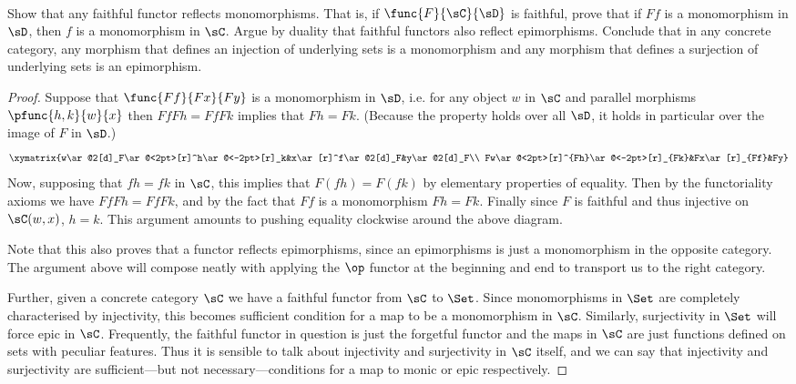 \documentclass[../../main]{subfiles}
\begin{document}
\paragraph{}
\begin{exercise}
	Show that any faithful functor reflects monomorphisms. That is, if
	\(\func{F}{\sC}{\sD}\) is faithful, prove that if \(Ff\) is a monomorphism
	in \(\sD\), then \(f\) is a monomorphism in \(\sC\). Argue by duality that
	faithful functors also reflect epimorphisms. Conclude that in any concrete
	category, any morphism that defines an injection of underlying sets is a
	monomorphism and any morphism that defines a surjection of underlying sets
	is an epimorphism.
\end{exercise}
\begin{proof}
	Suppose that \(\func{Ff}{Fx}{Fy}\) is a monomorphism in \(\sD\), i.e. for
	any object \(w\) in \(\sC\) and parallel morphisms \(\pfunc{h,k}{w}{x}\)
	then \(FfFh=FfFk\) implies that \(Fh=Fk\). (Because the property holds over
	all \(\sD\), it holds in particular over the image of \(F\) in \(\sD\).)
	\[
		\xymatrix{w\ar@2[d]_F\ar@<2pt>[r]^h\ar@<-2pt>[r]_k&x\ar[r]^f\ar@2[d]_F&y\ar@2[d]_F\\
		Fw\ar@<2pt>[r]^{Fh}\ar@<-2pt>[r]_{Fk}&Fx\ar[r]_{Ff}&Fy}
	\]
	Now, supposing that \(fh=fk\) in \(\sC\), this implies that \(F(fh)=F(fk)\)
	by elementary properties of equality. Then by the functoriality axioms we
	have \(FfFh=FfFk\), and by the fact that \(Ff\) is a monomorphism \(Fh=Fk\).
	Finally since \(F\) is faithful and thus injective on \(\sC(w,x)\), \(h=k\).
	This argument amounts to pushing equality clockwise around the above
	diagram.

	Note that this also proves that a functor reflects epimorphisms, since an
	epimorphisms is just a monomorphism in the opposite category. The argument
	above will compose neatly with applying the \(\op\) functor at the beginning
	and end to transport us to the right category.

	Further, given a concrete category \(\sC\) we have a faithful functor from
	\(\sC\) to \(\Set\). Since monomorphisms in \(\Set\) are completely
	characterised by injectivity, this becomes sufficient condition for a map to
	be a monomorphism in \(\sC\). Similarly, surjectivity in \(\Set\) will force
	epic in \(\sC\). Frequently, the faithful functor in question is just the
	forgetful functor and the maps in \(\sC\) are just functions defined on sets
	with peculiar features. Thus it is sensible to talk about injectivity and
	surjectivity in \(\sC\) itself, and we can say that injectivity and
	surjectivity are sufficient---but not necessary---conditions for a map to
	monic or epic respectively.
\end{proof}
\end{document}
